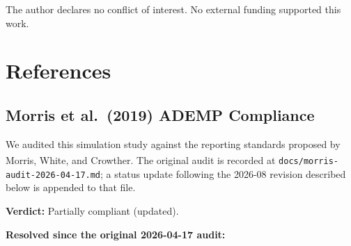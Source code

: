 \documentclass[
  11pt,
]{article}
\begin{document}
The author declares no conflict of interest. No external funding
supported this work.

\section{References}\label{references}

\subsection{Morris et al.~(2019) ADEMP Compliance}\label{morris-et-al.-2019-ademp-compliance}

We audited this simulation study against the reporting
standards proposed by Morris, White, and Crowther\textsuperscript{}. The original audit is recorded at
\texttt{docs/morris-audit-2026-04-17.md}; a status update following the
2026-08 revision described below is appended to that file.

\textbf{Verdict:} Partially compliant (updated).

\textbf{Resolved since the original 2026-04-17 audit:}
\end{document}
